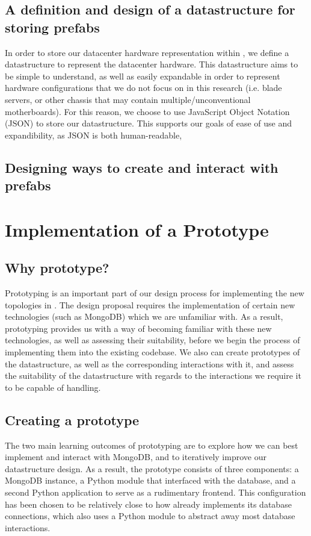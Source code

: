 \documentclass[11pt]{article}
\begin{document}
	\subsection{A definition and design of a datastructure for storing prefabs}
		In order to store our datacenter hardware representation within \opendc{}, we define a datastructure to represent the datacenter hardware. 
		This datastructure aims to be simple to understand, as well as easily expandable in order to represent hardware configurations that we do not focus on in this research (i.e. blade servers, or other chassis that may contain multiple/unconventional motherboards). 
		For this reason, we choose to use JavaScript Object Notation (JSON) to store our datastructure. 
		This supports our goals of ease of use and expandibility, as JSON is both human-readable, 
	
	\subsection{Designing ways to create and interact with prefabs}

\section{Implementation of a Prototype}

	\subsection{Why prototype?}
		Prototyping is an important part of our design process for implementing the new topologies in \opendc{}.
		The design proposal requires the implementation of certain new technologies (such as MongoDB) which we are unfamiliar with.
		As a result, prototyping provides us with a way of becoming familiar with these new technologies, as well as assessing their suitability, before we begin the process of implementing them into the existing \opendc{} codebase.
		We also can create prototypes of the datastructure, as well as the corresponding interactions with it, and assess the suitability of the datastructure with regards to the interactions we require it to be capable of handling.
	
	\subsection{Creating a prototype}
		The two main learning outcomes of prototyping are to explore how we can best implement and interact with MongoDB, and to iteratively improve our datastructure design.
		As a result, the prototype consists of three components: a MongoDB instance, a Python module that interfaced with the database, and a second Python application to serve as a rudimentary frontend. 
		This configuration has been chosen to be relatively close to how \opendc{} already implements its database connections, which also uses a Python module to abstract away most database interactions.
\end{document}

